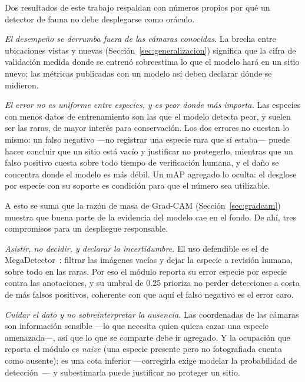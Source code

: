 \label{sec:responsable}

Dos resultados de este trabajo respaldan con números propios por qué un detector
de fauna no debe desplegarse como oráculo.

\emph{El desempeño se derrumba fuera de las cámaras conocidas.} La brecha entre
ubicaciones vistas y nuevas (Sección~\ref{sec:generalizacion}) significa que la
cifra de validación medida donde se entrenó sobreestima lo que el modelo hará en
un sitio nuevo; las métricas publicadas con un modelo así deben declarar dónde se
midieron.

\emph{El error no es uniforme entre especies, y es peor donde más importa.} Las
especies con menos datos de entrenamiento son las que el modelo detecta peor, y
suelen ser las raras, de mayor interés para conservación. Los dos errores no
cuestan lo mismo: un falso negativo —no registrar una especie rara que sí
estaba— puede hacer concluir que un sitio está vacío y justificar no protegerlo,
mientras que un falso positivo cuesta sobre todo tiempo de verificación humana, y
el daño se concentra donde el modelo es más débil. Un mAP agregado lo oculta: el
desglose por especie con su soporte es condición para que el número sea
utilizable.

A esto se suma que la razón de masa de Grad-CAM (Sección~\ref{sec:gradcam})
muestra que buena parte de la evidencia del modelo cae en el fondo. De ahí, tres
compromisos para un despliegue responsable.

\emph{Asistir, no decidir, y declarar la incertidumbre.} El uso defendible es el
de MegaDetector~\cite{beery2019efficient}: filtrar las imágenes vacías y dejar la
especie a revisión humana, sobre todo en las raras. Por eso el módulo reporta su
error especie por especie contra las anotaciones, y su umbral de 0.25 prioriza no
perder detecciones a costa de más falsos positivos, coherente con que aquí el
falso negativo es el error caro.

\emph{Cuidar el dato y no sobreinterpretar la ausencia.} Las coordenadas de las
cámaras son información sensible —lo que necesita quien quiera cazar una especie
amenazada—, así que lo que se comparte debe ir agregado. Y la ocupación que
reporta el módulo es \emph{naive} (una especie presente pero no fotografiada
cuenta como ausente): es una cota inferior —corregirla exige modelar la
probabilidad de detección~\cite{mackenzie2002estimating}— y subestimarla puede
justificar no proteger un sitio.
